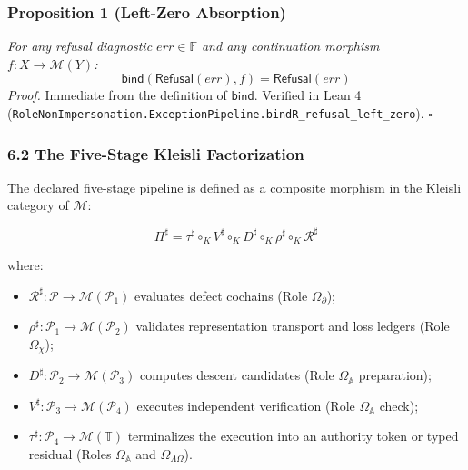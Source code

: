 \documentclass[
  10pt,
]{article}
\begin{document}
\subsubsection{Proposition 1 (Left-Zero Absorption)}\label{proposition-1-left-zero-absorption}

\emph{For any refusal diagnostic \hypertarget{math-E0103-0133}{}{\(err \in \mathbb{F}\)} and any continuation morphism \hypertarget{math-E0104-0134}{}{\(f : X \to \mathcal{M}(Y)\)}:} \hypertarget{math-E0105-0135}{}{\[\mathsf{bind}(\mathsf{Refusal}(err), f) = \mathsf{Refusal}(err)\]} \emph{Proof.} Immediate from the definition of \hypertarget{math-E0106-0136}{}{\(\mathsf{bind}\)}. Verified in Lean 4 (\texttt{RoleNonImpersonation.ExceptionPipeline.bindR\_refusal\_left\_zero}). \hypertarget{math-E0036-0137}{}{\(\square\)}

\subsubsection{6.2 The Five-Stage Kleisli Factorization}\label{the-five-stage-kleisli-factorization}

The declared five-stage pipeline is defined as a composite morphism in the Kleisli category of \hypertarget{math-E0007-0138}{}{\(\mathcal{M}\)}:

\hypertarget{math-E0107-0139}{}{\[\Pi^\sharp = \tau^\sharp \circ_K V^\sharp \circ_K D^\sharp \circ_K \rho^\sharp \circ_K \mathcal{R}^\sharp\]}

where:

\begin{itemize}
\item
  \hypertarget{math-E0108-0140}{}{\(\mathcal{R}^\sharp : \mathcal{P} \to \mathcal{M}(\mathcal{P}_1)\)} evaluates defect cochains (Role \hypertarget{math-E0022-0141}{}{\(\Omega_{\partial}\)});
\item
  \hypertarget{math-E0109-0142}{}{\(\rho^\sharp : \mathcal{P}_1 \to \mathcal{M}(\mathcal{P}_2)\)} validates representation transport and loss ledgers (Role \hypertarget{math-E0025-0143}{}{\(\Omega_{\chi}\)});
\item
  \hypertarget{math-E0110-0144}{}{\(D^\sharp : \mathcal{P}_2 \to \mathcal{M}(\mathcal{P}_3)\)} computes descent candidates (Role \hypertarget{math-E0023-0145}{}{\(\Omega_{\mathbb{A}}\)} preparation);
\item
  \hypertarget{math-E0111-0146}{}{\(V^\sharp : \mathcal{P}_3 \to \mathcal{M}(\mathcal{P}_4)\)} executes independent verification (Role \hypertarget{math-E0023-0147}{}{\(\Omega_{\mathbb{A}}\)} check);
\item
  \hypertarget{math-E0112-0148}{}{\(\tau^\sharp : \mathcal{P}_4 \to \mathcal{M}(\mathbb{T})\)} terminalizes the execution into an authority token or typed residual (Roles \hypertarget{math-E0023-0149}{}{\(\Omega_{\mathbb{A}}\)} and \hypertarget{math-E0028-0150}{}{\(\Omega_{\Lambda\Omega}\)}).
\end{itemize}
\end{document}
